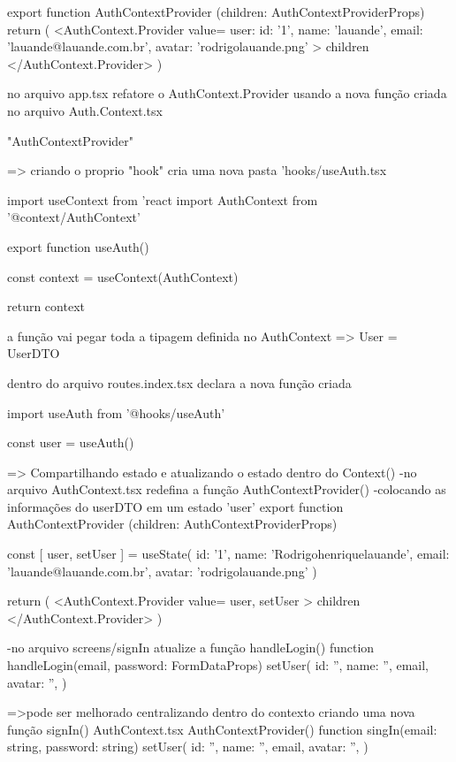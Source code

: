 {export function AuthContextProvider ({children}: AuthContextProviderProps) {
    return (
        <AuthContext.Provider value={{
            user:  {
              id: '1',
              name: 'lauande',
              email: 'lauande@lauande.com.br',
              avatar: 'rodrigolauande.png'
            }
          }}>
            {children}
          </AuthContext.Provider>
    )
}

no arquivo app.tsx refatore o AuthContext.Provider usando a nova função criada no arquivo Auth.Context.tsx

"AuthContextProvider"

=> criando o proprio "hook"
cria uma nova pasta 'hooks/useAuth.tsx

import {useContext} from 'react
import {AuthContext} from '@context/AuthContext'

export function useAuth() {
  const context = useContext(AuthContext)

  return context
}

a função vai pegar toda a tipagem definida no AuthContext => User = UserDTO

dentro do arquivo routes.index.tsx declara a nova função criada

import {useAuth} from '@hooks/useAuth'

const { user } = useAuth()

=> Compartilhando estado e atualizando o estado dentro do Context()
-no arquivo AuthContext.tsx redefina a função AuthContextProvider()
-colocando as informações do userDTO em um estado 'user'
export function AuthContextProvider ({children}: AuthContextProviderProps) {
    const [ user, setUser ] = useState({
        id: '1',
        name: 'Rodrigohenriquelauande',
        email: 'lauande@lauande.com.br',
        avatar: 'rodrigolauande.png'
    })

    return (
        <AuthContext.Provider value={{ user, setUser }}>
            {children}
          </AuthContext.Provider>
    )
}

-no arquivo screens/signIn atualize a função handleLogin()
function handleLogin({email, password}: FormDataProps) {
        setUser({
            id: '',
            name: '',
            email,
            avatar: '',
        })
    }


=>pode ser melhorado centralizando dentro do contexto criando uma nova função signIn()
AuthContext.tsx
AuthContextProvider()
function singIn(email: string, password: string) {
        setUser({
            id: '',
            name: '',
            email,
            avatar: '',
        })
}

}
